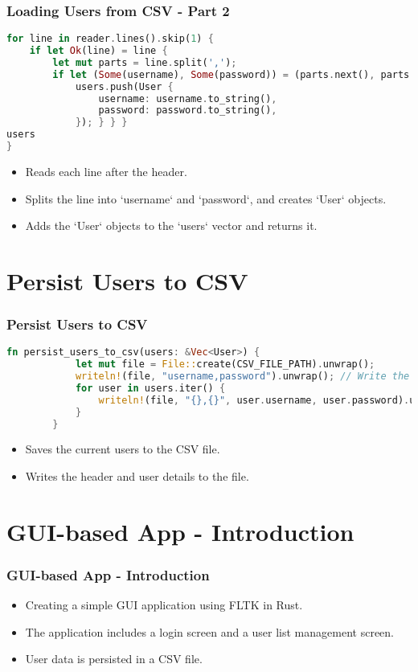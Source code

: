 \documentclass[aspectratio=169, table]{beamer}
\begin{document}
\begin{frame}[fragile]
\frametitle{Loading Users from CSV - Part 2}
\vspace{15pt}
\begin{lstlisting}[language=Rust]
for line in reader.lines().skip(1) {
	if let Ok(line) = line {
		let mut parts = line.split(',');
		if let (Some(username), Some(password)) = (parts.next(), parts.next()) {
			users.push(User {
				username: username.to_string(),
				password: password.to_string(),
			}); } } }
users
}
\end{lstlisting}
\begin{itemize}
\item Reads each line after the header.
\item Splits the line into `username` and `password`, and creates `User` objects.
\item Adds the `User` objects to the `users` vector and returns it.
\end{itemize}
\end{frame}



\section{Persist Users to CSV}
\begin{frame}[fragile]
	\frametitle{Persist Users to CSV}
	\begin{lstlisting}[language=Rust]
		fn persist_users_to_csv(users: &Vec<User>) {
			let mut file = File::create(CSV_FILE_PATH).unwrap();
			writeln!(file, "username,password").unwrap(); // Write the header
			for user in users.iter() {
				writeln!(file, "{},{}", user.username, user.password).unwrap();
			}
		}
	\end{lstlisting}
	\begin{itemize}
		\item Saves the current users to the CSV file.
		\item Writes the header and user details to the file.
	\end{itemize}
\end{frame}

\section{GUI-based App - Introduction}
\begin{frame}
\frametitle{GUI-based App - Introduction}
\begin{itemize}
\item Creating a simple GUI application using FLTK in Rust.
\item The application includes a login screen and a user list management screen.
\item User data is persisted in a CSV file.
\end{itemize}
\end{frame}
\end{document}
